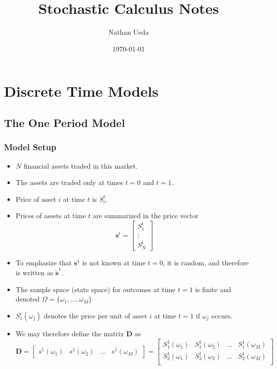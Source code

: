 \documentclass[11pt]{article}
\title{Stochastic Calculus Notes}
\author{Nathan Ueda}
\date{\today}
\begin{document}
\maketitle 
\pagebreak
\tableofcontents 
\pagebreak

\section{Discrete Time Models}
\subsection{The One Period Model}
\subsubsection{Model Setup}
\begin{itemize}
    \item $N$ financial assets traded in this market.
    \item The assets are traded only at times $t=0$ and $t=1$.
    \item Price of asset $i$ at time $t$ is $S_i^t$.
    \item Prices of assets at time $t$ are summarized in the price vector 
    \[ \boldsymbol{s}^t = \begin{bmatrix}
        S_1^t \\
        \vdots \\ 
        S_N^t
    \end{bmatrix}\]
    \item To emphasize that $\boldsymbol{s}^1$ is not known at time $t=0$, it is random, and 
    therefore is written as $\boldsymbol{\tilde{s}}^1$.
    \item The sample space (state space) for outcomes at time $t=1$ is finite and denoted 
    $\Omega = \{\omega_1, \ldots, \omega_M\}$ 
    \item $S_1^i(\omega_j)$ denotes the price per unit of asset $i$ at time $t=1$ if $\omega_j$
    occurs. 
    \item We may therefore define the matrix $\boldsymbol{D}$ as 
    \[
    \boldsymbol{D} = 
    \begin{bmatrix}
        s^1(\omega_1) & s^1(\omega_2) & \hdots & s^1(\omega_M) 
    \end{bmatrix} =
    \begin{bmatrix}
        S_1^1(\omega_1) & S_1^1(\omega_2) & \hdots & S_1^1(\omega_M) \\
        S_2^1(\omega_1) & S_2^1(\omega_2) & \hdots & S_2^1(\omega_M) \\

\end{bmatrix}\]
\end{itemize}
\end{document}
